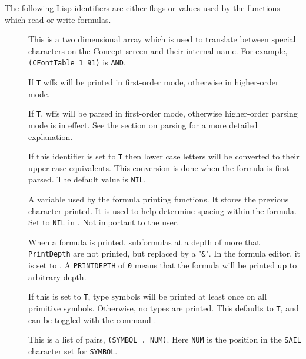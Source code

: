 The following Lisp identifiers are either flags or values used by the
functions which read or write formulas.

\begin{description}
\item [] 
This is a two dimensional array which is used to translate between
special characters on the Concept screen and their internal name.  For
example, {\tt (CFontTable 1 91)} is {\tt AND}.

\item [] 
If {\tt T} wffs will be printed in first-order mode, otherwise in higher-order
mode.

\item [] 
If {\tt T}, wffs will be parsed in first-order mode, otherwise higher-order
parsing mode is in effect.  See the section on parsing for a more
detailed explanation.

\item [] 
If this identifier is set to {\tt T} then lower case letters will be converted
to their upper case equivalents.  This conversion is done when the formula
is first parsed.  The default value is {\tt NIL}.

\item [] 
A variable used by the formula printing functions.  It stores the previous
character printed.  It is used to help determine spacing within the
formula.  Set to {\tt NIL} in .  Not important to the user.

\item [] 
When a formula is printed, subformulas at a depth of more that
{\tt PrintDepth} are not printed, but replaced by a "{\tt \&}".
In the formula editor, it is
set to .  A {\tt PRINTDEPTH} of {\tt 0} means that the formula
will be printed up to arbitrary depth.

\item [] 
If this is set to {\tt T}, type symbols will be printed at least once
on all primitive symbols.  Otherwise, no types are printed.  This
defaults to {\tt T}, and can be toggled with the command .

\item [] 
This is a list of pairs, {\tt (SYMBOL . NUM)}.  Here {\tt NUM} is the position
in the {\tt SAIL} character set for {\tt SYMBOL}.
\end{description}

